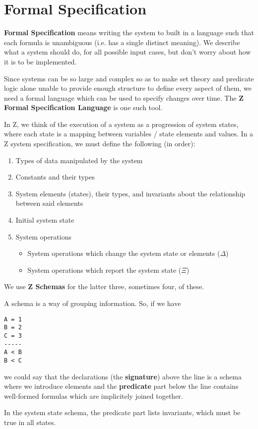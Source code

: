 \documentclass[12pt]{article}
\begin{document}
\section*{Formal Specification}
{\bf Formal Specification} means writing the system to built in a language such that each formula is unambiguous (i.e. has a single distinct meaning). We describe what a system should do, for all possible input cases, but don't worry about how it is to be implemented.

Since systems can be so large and complex so as to make set theory and predicate logic alone unable to provide enough structure to define every aspect of them, we need a formal language which can be used to specify changes over time. The {\bf Z Formal Specification Language} is one such tool.

In Z, we think of the execution of a system as a progression of system states, where each state is a mapping between variables / state elements and values. In a Z system specification, we must define the following (in order):
\begin{enumerate}
\item Types of data manipulated by the system
\item Constants and their types
\item System elements (states), their types, and invariants about the relationship between said elements
\item Initial system state
\item System operations
\begin{itemize}
\item System operations which change the system state or elements ($\Delta$)
\item System operations which report the system state ($\Xi$)
\end{itemize}
\end{enumerate}

We use {\bf Z Schemas} for the latter three, sometimes four, of these.

A schema is a way of grouping information. So, if we have
\begin{verbatim}
A = 1
B = 2
C = 3
-----
A < B
B < C
\end{verbatim}
we could say that the declarations (the {\bf signature}) above the line is a schema where we introduce elements and the {\bf predicate} part below the line contains well-formed formulas which are implicitely joined together.

In the system state schema, the predicate part lists invariants, which must be true in all states.
\end{document}
